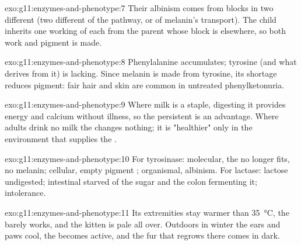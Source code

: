 \begin{solution}{exo:g11:enzymes-and-phenotype:7}
Their albinism comes from blocks in two different  (two different
 of the pathway, or of melanin's transport). The child inherits
one working  of each  from the parent whose block is
elsewhere, so both  work and pigment is made.
\end{solution}

\begin{solution}{exo:g11:enzymes-and-phenotype:8}
Phenylalanine accumulates; tyrosine (and what derives from it) is
lacking. Since melanin is made from tyrosine, its shortage reduces
pigment: fair hair and skin are common in untreated phenylketonuria.
\end{solution}

\begin{solution}{exo:g11:enzymes-and-phenotype:9}
Where milk is a staple, digesting it provides energy and calcium
without illness, so the persistent  is an advantage. Where
adults drink no milk the  changes nothing; it is "healthier"
only in the environment that supplies the .
\end{solution}

\begin{solution}{exo:g11:enzymes-and-phenotype:10}
For tyrosinase: molecular, the  no longer fits, no melanin;
cellular, empty pigment ; organismal, albinism. For lactase:
lactose undigested; intestinal  starved of the sugar and the
colon fermenting it; intolerance.
\end{solution}

\begin{solution}{exo:g11:enzymes-and-phenotype:11}
Its extremities stay warmer than \qty{35}{\celsius}, the  barely
works, and the kitten is pale all over. Outdoors in winter the ears
and paws cool, the  becomes active, and the fur that regrows
there comes in dark.
\end{solution}


